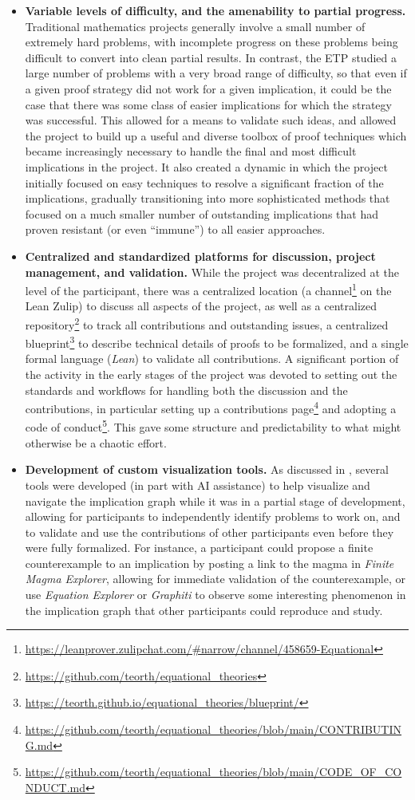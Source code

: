\documentclass[12pt]{amsart}
\theoremstyle{definition}
\begin{document}
\begin{itemize}
\item \textbf{Variable levels of difficulty, and the amenability to partial progress.}  Traditional mathematics projects generally involve a small number of extremely hard problems, with incomplete progress on these problems being difficult to convert into clean partial results.  In contrast, the ETP studied a large number of problems with a very broad range of difficulty, so that even if a given proof strategy did not work for a given implication, it could be the case that there was some class of easier implications for which the strategy was successful.  This allowed for a means to validate such ideas, and allowed the project to build up a useful and diverse toolbox of proof techniques which became increasingly necessary to handle the final and most difficult implications in the project.  It also created a dynamic in which the project initially focused on easy techniques to resolve a significant fraction of the implications, gradually transitioning into more sophisticated methods that focused on a much smaller number of outstanding implications that had proven resistant (or even ``immune'') to all easier approaches.
\item \textbf{Centralized and standardized platforms for discussion, project management, and validation.}  While the project was decentralized at the level of the participant, there was a centralized location (a channel\footnote{\url{https://leanprover.zulipchat.com/\#narrow/channel/458659-Equational}} on the Lean Zulip) to discuss all aspects of the project, as well as a centralized repository\footnote{\url{https://github.com/teorth/equational_theories}} to track all contributions and outstanding issues, a centralized blueprint\footnote{\url{https://teorth.github.io/equational_theories/blueprint/}} to describe technical details of proofs to be formalized, and a single formal language (\emph{Lean}) to validate all contributions. A significant portion of the activity in the early stages of the project was devoted to setting out the standards and workflows for handling both the discussion and the contributions, in particular setting up a contributions page\footnote{\url{https://github.com/teorth/equational_theories/blob/main/CONTRIBUTING.md}} and adopting a code of conduct\footnote{\url{https://github.com/teorth/equational_theories/blob/main/CODE_OF_CONDUCT.md}}.  This gave some structure and predictability to what might otherwise be a chaotic effort.
\item \textbf{Development of custom visualization tools.}  As discussed in , several tools were developed (in part with AI assistance) to help visualize and navigate the implication graph while it was in a partial stage of development, allowing for participants to independently identify problems to work on, and to validate and use the contributions of other participants even before they were fully formalized.  For instance, a participant could propose a finite counterexample to an implication by posting a link to the magma in \emph{Finite Magma Explorer}, allowing for immediate validation of the counterexample, or use \emph{Equation Explorer} or \emph{Graphiti} to observe some interesting phenomenon in the implication graph that other participants could reproduce and study.

\end{itemize}
\end{document}
